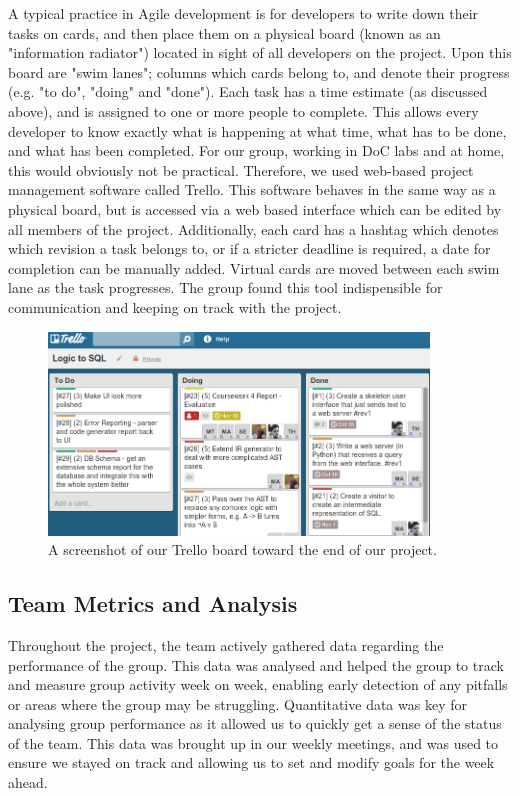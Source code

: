 \documentclass[a4paper, 11pt]{article}
\begin{document}
    A typical practice in Agile development is for developers to write down
    their tasks on cards, and then place them on a physical board (known as an
    "information radiator") located in sight of all developers on the project.
    Upon this board are "swim lanes"; columns which cards belong to, and denote
    their progress (e.g. "to do", "doing" and "done"). Each task has a time
    estimate (as discussed above), and is assigned to one or more people to
    complete.  This allows every developer to know exactly what is happening at
    what time, what has to be done, and what has been completed. For our group,
    working in DoC labs and at home, this would obviously not be practical.
    Therefore, we used web-based project management software called
    Trello. This software behaves in the same way as a physical board, but is
    accessed via a web based interface which can be edited by all members of
    the project.  Additionally, each card has a hashtag which denotes which
    revision a task belongs to, or if a stricter deadline is required, a date
    for completion can be manually added.  Virtual cards are moved between each
    swim lane as the task progresses. The group found this tool indispensible
    for communication and keeping on track with the project.


    \begin{figure}[h!]
      \centering
      \includegraphics[width=0.9\textwidth]{images/trello.png}
      \caption{A screenshot of our Trello board toward the end of our project.}
    \end{figure}

 \subsection{Team Metrics and Analysis}
Throughout the project, the team actively gathered data regarding the performance of the group. This data was analysed and helped the group to track and measure group activity week on week, enabling early detection of any pitfalls or areas where the group may be struggling. Quantitative data was key for analysing group performance as it allowed us to quickly get a sense of the status of the team. This data was brought up in our weekly meetings, and was used to ensure we stayed on track and allowing us to set and modify goals for the week ahead.
\end{document}
